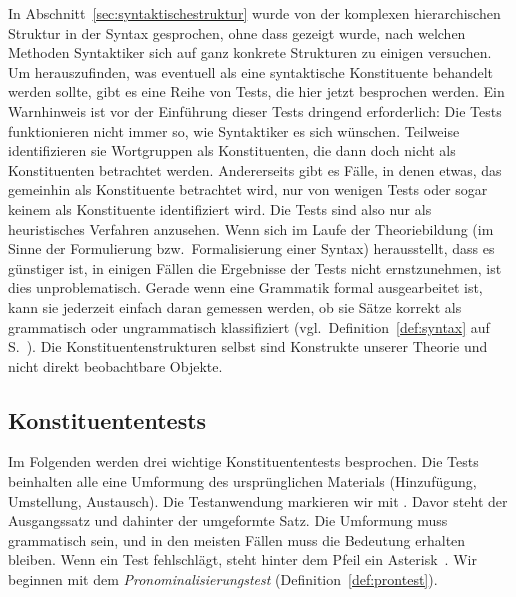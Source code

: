 In Abschnitt~\ref{sec:syntaktischestruktur} wurde von der komplexen hierarchischen Struktur in der Syntax gesprochen, ohne dass gezeigt wurde, nach welchen Methoden Syntaktiker sich auf ganz konkrete Strukturen zu einigen versuchen.
Um herauszufinden, was eventuell als eine syntaktische Konstituente behandelt werden sollte, gibt es eine Reihe von Tests, die hier jetzt besprochen werden.
Ein Warnhinweis ist vor der Einführung dieser Tests dringend erforderlich:
Die Tests funktionieren nicht immer so, wie Syntaktiker es sich wünschen.
Teilweise identifizieren sie Wortgruppen als Konstituenten, die dann doch nicht als Konstituenten betrachtet werden.
Andererseits gibt es Fälle, in denen etwas, das gemeinhin als Konstituente betrachtet wird, nur von wenigen Tests oder sogar keinem als Konstituente identifiziert wird.
Die Tests sind also nur als heuristisches Verfahren anzusehen.
Wenn sich im Laufe der Theoriebildung (im Sinne der Formulierung bzw.\ Formalisierung einer Syntax) herausstellt, dass es günstiger ist, in einigen Fällen die Ergebnisse der Tests nicht ernstzunehmen, ist dies unproblematisch.
Gerade wenn eine Grammatik formal ausgearbeitet ist, kann sie jederzeit einfach daran gemessen werden, ob sie Sätze korrekt als grammatisch oder ungrammatisch klassifiziert (vgl.\ Definition~\ref{def:syntax} auf S.~\pageref{def:syntax}).
Die Konstituentenstrukturen selbst sind Konstrukte unserer Theorie und nicht direkt beobachtbare Objekte.

\subsection{Konstituententests}
\label{sec:konstituententests}

Im Folgenden werden drei wichtige Konstituententests besprochen.
Die Tests beinhalten alle eine Umformung des ursprünglichen Materials (Hinzufügung, Umstellung, Austausch).
Die Testanwendung markieren wir mit .
Davor steht der Ausgangssatz und dahinter der umgeformte Satz.
Die Umformung muss grammatisch sein, und in den meisten Fällen muss die Bedeutung erhalten bleiben.
Wenn ein Test fehlschlägt, steht hinter dem Pfeil ein Asterisk~\Ast.
Wir beginnen mit dem \textit{Pronominalisierungstest} (Definition~\ref{def:prontest}).


